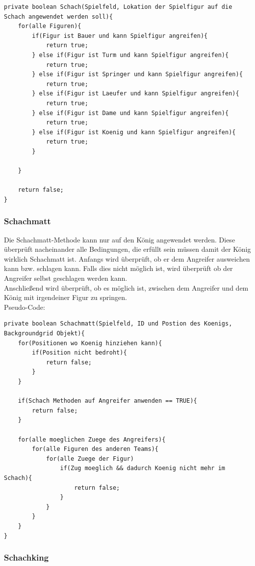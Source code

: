 \documentclass[12pt,a4paper]{article}
\begin{document}
\lstset{language=Java}
\begin{lstlisting}
private boolean Schach(Spielfeld, Lokation der Spielfigur auf die Schach angewendet werden soll){
	for(alle Figuren){
		if(Figur ist Bauer und kann Spielfigur angreifen){
			return true;		
		} else if(Figur ist Turm und kann Spielfigur angreifen){
			return true;
		} else if(Figur ist Springer und kann Spielfigur angreifen){
			return true;
		} else if(Figur ist Laeufer und kann Spielfigur angreifen){
			return true;
		} else if(Figur ist Dame und kann Spielfigur angreifen){
			return true;
		} else if(Figur ist Koenig und kann Spielfigur angreifen){
			return true;
		}
		
	}
	
	return false;	
}
\end{lstlisting}

\subsubsection{Schachmatt}
\label{SUBSUBSEC:checkmate}

Die Schachmatt-Methode kann nur auf den König angewendet werden. Diese überprüft nacheinander alle Bedingungen, die erfüllt sein müssen damit der König wirklich Schachmatt ist. Anfangs wird überprüft, ob er dem Angreifer ausweichen kann bzw. schlagen kann. Falls dies nicht möglich ist, wird überprüft ob der Angreifer selbst geschlagen werden kann. \\
Anschließend wird überprüft, ob es möglich ist, zwischen dem Angreifer und dem König mit irgendeiner Figur zu springen. \\
Pseudo-Code:

\lstset{language=Java}
\begin{lstlisting}
private boolean Schachmatt(Spielfeld, ID und Postion des Koenigs, Backgroundgrid Objekt){
	for(Positionen wo Koenig hinziehen kann){
		if(Position nicht bedroht){
			return false;
		}
	}
	
	if(Schach Methoden auf Angreifer anwenden == TRUE){
		return false;
	}
	
	for(alle moeglichen Zuege des Angreifers){
		for(alle Figuren des anderen Teams){
			for(alle Zuege der Figur)
				if(Zug moeglich && dadurch Koenig nicht mehr im Schach){
					return false;
				}
			}			
		}
	}
}
\end{lstlisting}


\subsubsection{Schachking}
\label{SUBSUBSEC:checkking}
\end{document}
